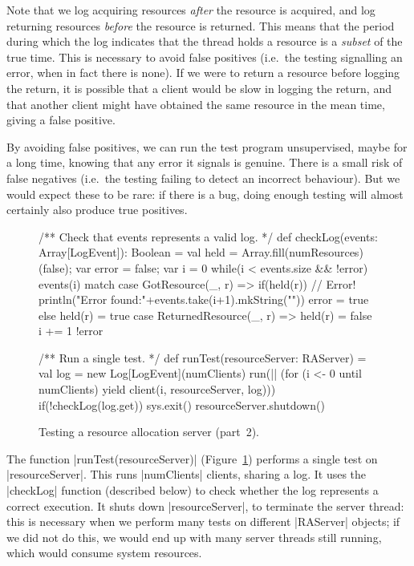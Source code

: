 
Note that we log acquiring resources \emph{after} the resource is acquired,
and log returning resources \emph{before} the resource is returned.  This
means that the period during which the log indicates that the thread holds a
resource is a \emph{subset} of the true time.
%
This is necessary to avoid false positives (i.e.~the testing signalling an
error, when in fact there is none).  If we were to return a resource before
logging the return, it is possible that a client would be slow in logging the
return, and that another client might have obtained the same resource in the
mean time, giving a false positive.

By avoiding false positives, we can run the test program unsupervised,
maybe for a long time, knowing that any error it signals is genuine.
%
There is a small risk of false negatives (i.e.~the testing failing to
detect an incorrect behaviour).  But we would expect these to be rare: if
there is a bug, doing enough testing will almost certainly also produce true
positives.



\begin{figure}
\begin{scala}
  /** Check that events represents a valid log.  */
  def checkLog(events: Array[LogEvent]): Boolean = {
    val held = Array.fill(numResources)(false); var error = false; var i = 0
    while(i < events.size && !error){
      events(i) match{
        case GotResource(_, r) =>
          if(held(r)){ // Error!
            println("Error found:\n"+events.take(i+1).mkString("\n"))
            error = true
          }
          else held(r) = true
        case ReturnedResource(_, r) => held(r) = false
      }
      i += 1
    }
    !error
  }

  /** Run a single test. */
  def runTest(resourceServer: RAServer) = {
    val log = new Log[LogEvent](numClients)
    run(|| (for (i <- 0 until numClients) yield client(i, resourceServer, log)))
    if(!checkLog(log.get)) sys.exit()
    resourceServer.shutdown()
  }
\end{scala}
\caption{Testing a resource allocation server (part~2).}
\label{fig:RATest-2}
\end{figure}


The function |runTest(resourceServer)| (Figure~\ref{fig:RATest-2}) performs a
single test on |resourceServer|.  This runs |numClients| clients, sharing a
log.  It uses the |checkLog| function (described below) to check whether the
log represents a correct execution.  It shuts down |resourceServer|, to
terminate the server thread: this is necessary when we perform many tests on
different |RAServer| objects; if we did not do this, we would end up with many
server threads still running, which would consume system resources.

